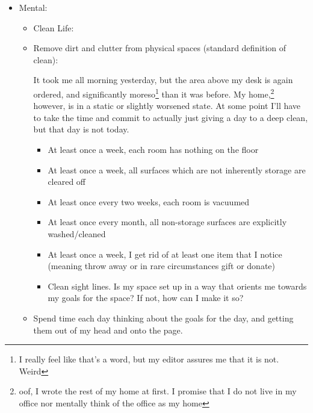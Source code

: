 \documentclass[12pt]{article}[titlepage]
\renewcommand{\,}{\textsuperscript{,}}
\begin{document}
\begin{itemize}
\begin{itemize}
\begin{itemize}
I don't know if I'm doing something wrong but wow is sitting up straight kinking my shoulder something fierce.  
\item Go to group fitness classes more regularly and more often. If not, do workout at home  
  
Haven't worked out yet today, but am planning to when I get home.\footnote{because I have the goal of getting work done, and I still don't let myself work at home.}  
\item Feed myself simply and healthily. Healthy here means trying to generally avoid processing.  
  
Ehhhh, most of my food since the last reflection was potluck style.  
I don't believe in mandating someone else's diet, especially when they are helping to feed me.  
\end{itemize}

\item Mental:   
\begin{itemize}  
\item Clean Life:   
\item Remove dirt and clutter from physical spaces (standard definition of clean):

It took me all morning yesterday, but the area above my desk is again ordered, and significantly moreso\footnote{I really feel like that's a word, but my editor assures me that it is not. Weird} than it was before.  
My home,\footnote{oof, I wrote the rest of my home at first. I promise that I do not live in my office nor mentally think of the office as my home} however, is in a static or slightly worsened state.  
At some point I'll have to take the time and commit to actually just giving a day to a deep clean, but that day is not today.

\begin{itemize}  
\item At least once a week, each room has nothing on the floor  
\item At least once a week, all surfaces which are not inherently storage are cleared off  
\item At least once every two weeks, each room is vacuumed  
\item At least once every month, all non-storage surfaces are explicitly washed/cleaned  
\item At least once a week, I get rid of at least one item that I notice (meaning throw away or in rare circumstances gift or donate)  
\item Clean sight lines. Is my space set up in a way that orients me towards my goals for the space? If not, how can I make it so?  
\end{itemize}  
\item Spend time each day thinking about the goals for the day, and getting them out of my head and onto the page.


\end{itemize}
\end{itemize}
\end{itemize}
\end{document}
